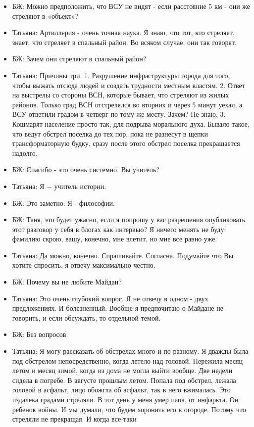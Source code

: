 \begin{itemize}
\item БЖ: Можно предположить, что ВСУ не видят - если расстояние 5 км - они же стреляют в «объект»?
\item Татьяна: Артиллерия - очень точная наука. Я знаю, что тот, кто стреляет, знает, что стреляет в спальный район. Во всяком случае, они так говорят.
\item БЖ: Зачем они стреляют в спальный район?
\item Татьяна: Причины три. 1. Разрушение инфраструктуры города для того, чтобы выжать отсюда людей и создать трудности местным властям. 2. Ответ на выстрелы со стороны ВСН, которые бывает, что стреляют из жилых районов. Только град ВСН отстрелялся во вторник и через 5 минут уехал, а ВСУ ответили градом в четверг по тому же месту. Зачем? Не знаю. 3. Кошмарят население просто так, для подрыва морального духа. Бывало такое, что ведут обстрел поселка до тех пор, пока не разнесут в щепки трансформаторную будку, сразу после этого обстрел поселка прекращается надолго.
\item БЖ: Спасибо - это очень системно. Вы учитель?
\item Татьяна: Я − учитель истории.
\item БЖ: Это заметно. Я - философии.
\item БЖ: Таня, это будет ужасно, если я попрошу у вас разрешения опубликовать этот разговор у себя в блогах как интервью? Я ничего менять не буду: фамилию скрою, вашу, конечно, мне влетит, но мне все равно уже.
\item Татьяна: Да можно, конечно. Спрашивайте. Согласна. Подумайте что Вы хотите спросить, я отвечу максимально честно.
\item БЖ: Почему вы не любите Майдан?
\item Татьяна: Это очень глубокий вопрос. Я не отвечу в одном - двух предложениях. И болезненный. Вообще я предпочитаю о Майдане не говорить, и если обсуждать, то отдельной темой.
\item БЖ: Без вопросов.
\item Татьяна: Я могу рассказать об обстрелах много и по-разному. Я дважды была
под обстрелом непосредственно, когда летело над головой. Пережила месяц летом и
месяц зимой, когда из дома не могла выйти вообще. Две недели сидела в погребе.
В августе прошлым летом. Попала под обстрел, лежала головой в асфальт, лицо
обожгла об асфальт, так в него вжималась. Это издалека градами стреляли. В тот
день у меня умер папа, от инфаркта. Он ребенок войны. И мы думали, что будем
хоронить его в огороде. Потому что стреляли не прекращая. И когда все-таки

\end{itemize}
